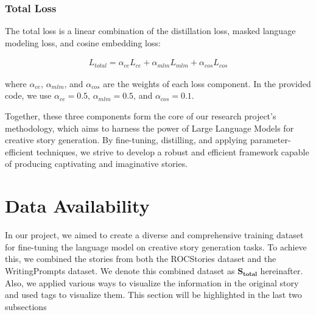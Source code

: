 \documentclass[letterpaper]{article}
\begin{document}
\subsubsection{Total Loss}
The total loss is a linear combination of the distillation loss, masked language modeling loss, and cosine embedding loss:

\begin{align}
L_{total} = \alpha_{ce} L_{ce} + \alpha_{mlm} L_{mlm} + \alpha_{cos} L_{cos}
\end{align}

where $\alpha_{ce}$, $\alpha_{mlm}$, and $\alpha_{cos}$ are the weights of each loss component. In the provided code, we use $\alpha_{ce} = 0.5$, $\alpha_{mlm} = 0.5$, and $\alpha_{cos} = 0.1$.


Together, these three components form the core of our research project's methodology, which aims to harness the power of Large Language Models for creative story generation. By fine-tuning, distilling, and applying parameter-efficient techniques, we strive to develop a robust and efficient framework capable of producing captivating and imaginative stories.
\section{Data Availability}
In our project, we aimed to create a diverse and comprehensive training dataset for fine-tuning the language model on creative story generation tasks. To achieve this, we combined the stories from both the ROCStories dataset and the WritingPrompts dataset. We denote this combined dataset as $\mathbf{S_{total}}$ hereinafter. Also, we applied various ways to visualize the information in the original story and used tags to visualize them. This section will be highlighted in the last two subsections
\end{document}
